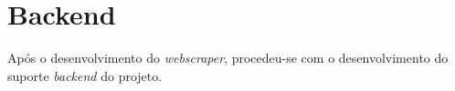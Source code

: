 
\section{Backend}
Após o desenvolvimento do \textit{webscraper}, procedeu-se com o desenvolvimento do suporte \textit{backend} do projeto.









\newpage



\newpage





\newpage



\newpage


